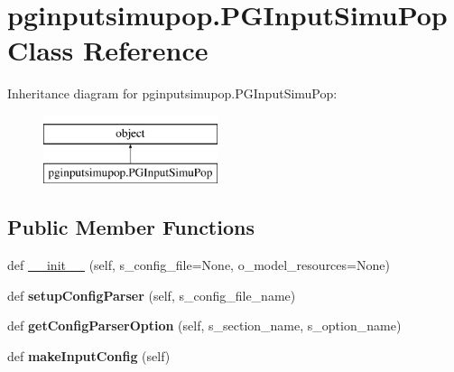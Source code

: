 \hypertarget{classpginputsimupop_1_1PGInputSimuPop}{}\section{pginputsimupop.\+P\+G\+Input\+Simu\+Pop Class Reference}
\label{classpginputsimupop_1_1PGInputSimuPop}
Inheritance diagram for pginputsimupop.\+P\+G\+Input\+Simu\+Pop\+:\begin{figure}[H]
\begin{center}
\leavevmode
\includegraphics[height=2.000000cm]{classpginputsimupop_1_1PGInputSimuPop}
\end{center}
\end{figure}
\subsection*{Public Member Functions}
\begin{DoxyCompactItemize}
\item 
def \hyperlink{classpginputsimupop_1_1PGInputSimuPop_a2ad2ad5300386fff5ab889a61f9b2d7d}{\+\_\+\+\_\+init\+\_\+\+\_\+} (self, s\+\_\+config\+\_\+file=None, o\+\_\+model\+\_\+resources=None)
\item 
def {\bfseries setup\+Config\+Parser} (self, s\+\_\+config\+\_\+file\+\_\+name)\hypertarget{classpginputsimupop_1_1PGInputSimuPop_aa48eb98bc3595313e25f5ee20c6bca85}{}\label{classpginputsimupop_1_1PGInputSimuPop_aa48eb98bc3595313e25f5ee20c6bca85}

\item 
def {\bfseries get\+Config\+Parser\+Option} (self, s\+\_\+section\+\_\+name, s\+\_\+option\+\_\+name)\hypertarget{classpginputsimupop_1_1PGInputSimuPop_ad614f298069b85664886220af4984568}{}\label{classpginputsimupop_1_1PGInputSimuPop_ad614f298069b85664886220af4984568}

\item 
def {\bfseries make\+Input\+Config} (self)\hypertarget{classpginputsimupop_1_1PGInputSimuPop_aad0017aeba87cd60a2b8ab39bc69a56d}{}\label{classpginputsimupop_1_1PGInputSimuPop_aad0017aeba87cd60a2b8ab39bc69a56d}

\end{DoxyCompactItemize}
